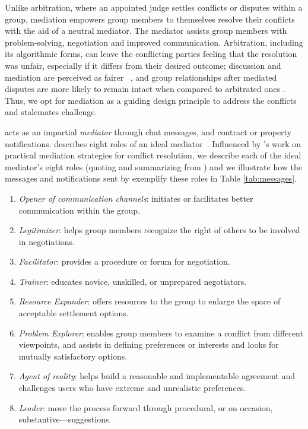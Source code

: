 

\pMediation Unlike arbitration, where an appointed judge settles conflicts or disputes within a group, mediation empowers group members to themselves resolve their conflicts with the aid of a neutral mediator. The mediator assists group members with problem-solving, negotiation and improved communication. Arbitration, including its algorithmic forms, can leave the conflicting parties feeling that the resolution was unfair, especially if it differs from their desired outcome; discussion and mediation are perceived as fairer ~\cite{algorithmicmediation}, and group relationships after mediated disputes are more likely to remain intact when compared to arbitrated ones \cite{disputeresolutionexplanation2}. Thus, we opt for mediation as a guiding design principle to address the conflicts and stalemates challenge.

\cbot acts as an impartial \textit{mediator} through chat messages, and contract or property notifications. \citeauthor{themediationprocess} describes eight roles of an ideal mediator~\cite{themediationprocess}. Influenced by \citeauthor{themediationprocess}'s work on practical mediation strategies for conflict resolution, we describe each of the ideal mediator's eight roles (quoting and summarizing from \cite{themediationprocess}) and we illustrate how the messages and notifications sent by \cbot exemplify these roles in Table \ref{tab:messages}. 



\begin{enumerate}
    \item \textit{Opener of communication channels}: initiates or facilitates better communication within the group. 

    \item \textit{Legitimizer}: helps group members recognize the right of others to be involved in negotiations.
    
    \item \textit{Facilitator}: provides a procedure or forum for negotiation.
    
\item \textit{Trainer}: educates novice, unskilled, or unprepared negotiators.

\item \textit{Resource Expander}: offers resources to the group to enlarge the space of acceptable settlement options.

\item \textit{Problem Explorer}: enables group members to examine a conflict from different viewpoints, and assists in defining preferences or interests and looks for mutually satisfactory options.
    
\item \textit{Agent of reality}: helps build a reasonable and implementable agreement and challenges users who have extreme and unrealistic preferences.

\item \textit{Leader}: move the process forward through procedural, or on occasion, substantive—suggestions.
\end{enumerate}



